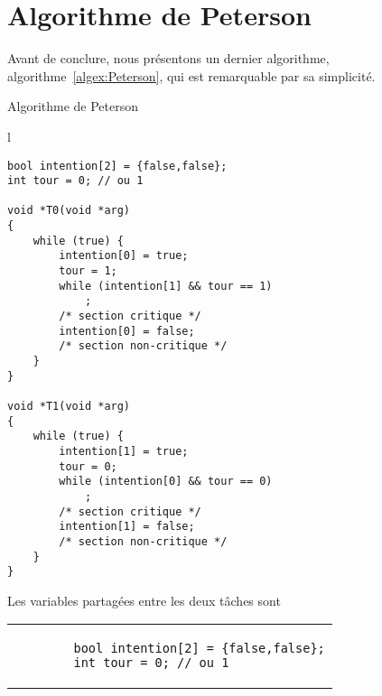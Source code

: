 \section{Algorithme de Peterson}
Avant de conclure, nous présentons un dernier algorithme, algorithme~\ref{algex:Peterson}, qui est remarquable par sa simplicité.
\begin{algorithm}[!ht]
\caption{Algorithme de Peterson}\label{algex:Peterson}
\centering
\begin{tabular}{l}
\lstset{language=C++}
\begin{lstlisting}
bool intention[2] = {false,false};
int tour = 0; // ou 1

void *T0(void *arg)
{
	while (true) {
		intention[0] = true;
		tour = 1;
		while (intention[1] && tour == 1)
			;
		/* section critique */
		intention[0] = false;
		/* section non-critique */
	}
}

void *T1(void *arg)
{
	while (true) {
		intention[1] = true;
		tour = 0;
		while (intention[0] && tour == 0)
			;
		/* section critique */
		intention[1] = false;
		/* section non-critique */
	}
}
\end{lstlisting}
\end{tabular}

\end{algorithm}

Les variables partagées entre les deux tâches sont
\centering
\begin{tabular}{l}
\lstset{language=C++}
\begin{lstlisting}
		bool intention[2] = {false,false};
		int tour = 0; // ou 1
\end{lstlisting}
\end{tabular}

